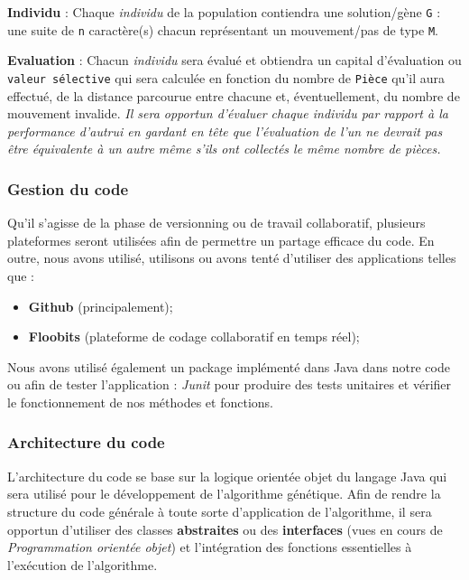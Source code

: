 \textbf{Individu} : Chaque \emph{individu} de la population contiendra
une solution/gène \texttt{G} : une suite de \texttt{n} caractère(s)
chacun représentant un mouvement/pas de type \texttt{M}.

\textbf{Evaluation} : Chacun \emph{individu} sera évalué et obtiendra un
capital d'évaluation ou \texttt{valeur\ sélective} qui sera calculée en
fonction du nombre de \texttt{Pièce} qu'il aura effectué, de la distance
parcourue entre chacune et, éventuellement, du nombre de mouvement
invalide. \emph{Il sera opportun d'évaluer chaque individu par rapport à
la performance d'autrui en gardant en tête que l'évaluation de l'un ne
devrait pas être équivalente à un autre même s'ils ont collectés le même
nombre de pièces.}

\hypertarget{gestion-du-code}{%
\subsubsection{Gestion du code}\label{gestion-du-code}}

Qu'il s'agisse de la phase de versionning ou de travail collaboratif,
plusieurs plateformes seront utilisées afin de permettre un partage
efficace du code. En outre, nous avons utilisé, utilisons ou avons tenté
d'utiliser des applications telles que :

\begin{itemize}
\tightlist
\item
  \textbf{Github} (principalement);
\item
  \textbf{Floobits} (plateforme de codage collaboratif en temps réel);
\end{itemize}

Nous avons utilisé également un package implémenté dans Java dans notre
code ou afin de tester l'application : \emph{Junit} pour produire des
tests unitaires et vérifier le fonctionnement de nos méthodes et
fonctions.

\hypertarget{architecture-du-code}{%
\subsubsection{Architecture du code}\label{architecture-du-code}}

L'architecture du code se base sur la logique orientée objet du langage
Java qui sera utilisé pour le développement de l'algorithme génétique.
Afin de rendre la structure du code générale à toute sorte d'application
de l'algorithme, il sera opportun d'utiliser des classes
\textbf{abstraites} ou des \textbf{interfaces} (vues en cours de
\emph{Programmation orientée objet}) et l'intégration des fonctions
essentielles à l'exécution de l'algorithme.


